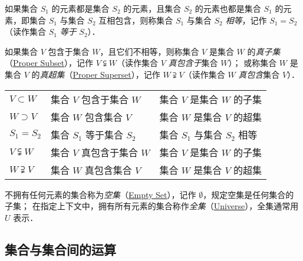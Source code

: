 如果集合 $S_1$ 的元素都是集合 $S_2$ 的元素，且集合 $S_2$ 的元素也都是集合 $S_1$ 的元素，即集合 $S_1$ 与集合 $S_2$ 互相包含，则称集合 $S_1$ 与集合 $S_2$ \emph{相等}，记作 $S_1=S_2$（读作集合 $S_1$ \emph{等于} $S_2$）．

如果集合 $V$ 包含于集合 $W$，且它们不相等，则称集合 $V$ 是集合 $W$ 的\emph{真子集}（\href{http://mathworld.wolfram.com/ProperSubset.html}{Proper Subset}），记作 $V\subsetneqq{}W$（读作集合 $V$ \emph{真包含于}集合 $W$）；
或称集合 $W$ 是集合 $V$ 的\emph{真超集}（\href{http://mathworld.wolfram.com/ProperSuperset.html}{Proper Superset}），记作 $W\supsetneqq{}V$（读作集合 $W$ \emph{真包含}集合 $V$）．

\begin{table}[h]
	\centering
	\begin{tabular}{l l l}
		\hline
		$V\subset{}W$     & 集合 $V$ 包含于集合 $W$   & 集合 $V$ 是集合 $W$ 的子集   \\
		$W\supset{}V$     & 集合 $W$ 包含集合 $V$     & 集合 $W$ 是集合 $V$ 的超集   \\
		$S_1=S_2$         & 集合 $S_1$ 等于集合 $S_2$ & 集合 $S_1$ 与集合 $S_2$ 相等 \\
		$V\subsetneqq{}W$ & 集合 $V$ 真包含于集合 $W$ & 集合 $V$ 是集合 $W$ 的子集   \\
		$W\supsetneqq{}V$ & 集合 $W$ 真包含集合 $V$   & 集合 $W$ 是集合 $V$ 的超集   \\
		\hline
	\end{tabular}
\end{table}

不拥有任何元素的集合称为\emph{空集}（\href{http://mathworld.wolfram.com/EmptySet.html}{Empty Set}），记作 $\emptyset$，规定空集是任何集合的子集；
在指定上下文中，拥有所有元素的集合称作\emph{全集}（\href{http://mathworld.wolfram.com/UniversalSet.html}{Universe}），全集通常用 $U$ 表示．
%

\subsection{集合与集合间的运算}
%
%

\appendix

